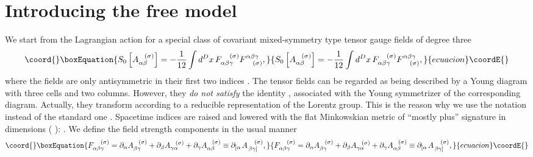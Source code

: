 \documentclass[a4paper,12pt]{article}
\begin{document}
\section{Introducing the free model}

We start from the Lagrangian action for a special class of covariant
mixed-symmetry type tensor gauge fields of degree three 
\begin{equation}\coord{}\boxEquation{
S_{0}\left[ A_{\alpha \beta }^{\;\;\;(\sigma )}\right] =-\frac{1}{12}\int
d^{D}x\,F_{\alpha \beta \gamma }^{\;\;\;\;(\sigma )}F_{\;\;\;\;(\sigma
)}^{\alpha \beta \gamma },  \label{fcol1}
}{
S_{0}\left[ A_{\alpha \beta }^{\;\;\;(\sigma )}\right] =-\frac{1}{12}\int
d^{D}x\,F_{\alpha \beta \gamma }^{\;\;\;\;(\sigma )}F_{\;\;\;\;(\sigma
)}^{\alpha \beta \gamma },  }{ecuacion}\coordE{}\end{equation}
where the fields are only antisymmetric in their first two indices \coordHE{}.
The tensor fields \coordHE{} can be regarded as
being described by a Young diagram with three cells and two columns.
However, they \textit{do not satisfy} the identity \coordHE{}, associated with the Young symmetrizer of the
corresponding diagram. Actually, they transform according to a reducible
representation of the Lorentz group. This is the reason why we use the
notation \coordHE{} instead of the standard one \coordHE{}. Spacetime indices are raised and lowered with the flat
Minkowskian metric of ``mostly plus'' signature in \coordHE{} dimensions (\coordHE{}%
): \myHighlight{$-+++\cdots $}\coordHE{}. We define the field strength components in the usual
manner 
\begin{equation}\coord{}\boxEquation{
F_{\alpha \beta \gamma }^{\;\;\;\;(\sigma )}=\partial _{\alpha }A_{\beta
\gamma }^{\;\;\;(\sigma )}+\partial _{\beta }A_{\gamma \alpha
}^{\;\;\;(\sigma )}+\partial _{\gamma }A_{\alpha \beta }^{\;\;\;(\sigma
)}\equiv \partial _{\left[ \alpha \right. }A_{\left. \beta \gamma \right]
}^{\;\;\;\;(\sigma )},  \label{fcol2}
}{
F_{\alpha \beta \gamma }^{\;\;\;\;(\sigma )}=\partial _{\alpha }A_{\beta
\gamma }^{\;\;\;(\sigma )}+\partial _{\beta }A_{\gamma \alpha
}^{\;\;\;(\sigma )}+\partial _{\gamma }A_{\alpha \beta }^{\;\;\;(\sigma
)}\equiv \partial _{\left[ \alpha \right. }A_{\left. \beta \gamma \right]
}^{\;\;\;\;(\sigma )},  }{ecuacion}\coordE{}\end{equation}
\end{document}
